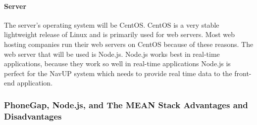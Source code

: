 \documentclass[11pt]{article}
\begin{document}
\paragraph{Server}
The server's operating system will be CentOS. CentOS is a very stable lightweight release of Linux and is primarily used for web servers. Most web hosting companies run their web servers on CentOS because of these reasons. The web server that will be used is Node.js. Node.js works best in real-time applications, because they work so well in real-time applications Node.js is perfect for the NavUP system which needs to provide real time data to the front-end application.

\subsubsection{PhoneGap, Node.js,  and The MEAN Stack Advantages and Disadvantages}
\end{document}
